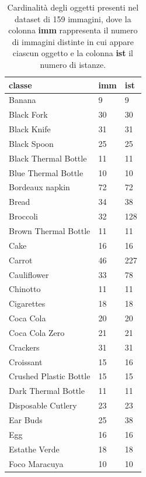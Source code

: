 \documentclass[../main.tex]{subfiles}
\begin{document}
\begin{table}[h!]
    \centering
    \caption{Cardinalità degli oggetti presenti nel dataset di 159 immagini, dove la colonna \textbf{imm} rappresenta il numero di immagini distinte in cui appare ciascun oggetto e la colonna \textbf{ist} il numero di istanze.}
    \label{tab:full_cardinalities}
    \small
    \begin{tabular}{|l|l|l|} %
        \hline \textbf{classe} & \textbf{imm} & \textbf{ist} \\ \hline
        Banana & 9 & 9 \\ \hline
        Black Fork & 30 & 30 \\ \hline
        Black Knife & 31 & 31 \\ \hline
        Black Spoon & 25 & 25 \\ \hline
        Black Thermal Bottle & 11 & 11 \\ \hline
        Blue Thermal Bottle & 10 & 10 \\ \hline
        Bordeaux napkin & 72 & 72 \\ \hline
        Bread & 34 & 38 \\ \hline
        Broccoli & 32 & 128 \\ \hline
        Brown Thermal Bottle & 11 & 11 \\ \hline
        Cake & 16 & 16 \\ \hline
        Carrot & 46 & 227 \\ \hline
        Cauliflower & 33 & 78 \\ \hline
        Chinotto & 11 & 11 \\ \hline
        Cigarettes & 18 & 18 \\ \hline
        Coca Cola & 20 & 20 \\ \hline
        Coca Cola Zero & 21 & 21 \\ \hline
        Crackers & 31 & 31 \\ \hline
        Croissant & 15 & 16 \\ \hline
        Crushed Plastic Bottle & 15 & 15 \\ \hline
        Dark Thermal Bottle & 11 & 11 \\ \hline
        Disposable Cutlery & 23 & 23 \\ \hline
        Ear Buds & 25 & 38 \\ \hline
        Egg & 16 & 16 \\ \hline
        Estathe Verde & 18 & 18 \\ \hline
        Foco Maracuya & 10 & 10 \\ \hline

\end{tabular}
\end{table}
\end{document}
